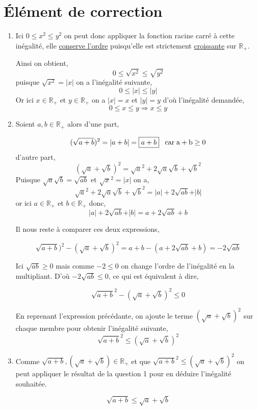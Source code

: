 \documentclass[french]{book}
\newcommand{\ie}{\leq}
\begin{document}
\section*{Élément de correction}
\begin{enumerate}
\item Ici $0\leq x^2 \leq y^2$ on peut donc appliquer la fonction racine carré à cette inégalité, elle \underline{conserve l'ordre} puisqu'elle est strictement \underline{croissante} sur $\mathbb{R}_+$.

Ainsi on obtient,
$$0\ie \sqrt{x^2} \ie \sqrt{y^2}$$
puisque $\sqrt{x^2}=\vert x \vert$ on a l'inégalité suivante,
$$0 \ie \vert x \vert \ie \vert y \vert$$ 
Or ici $x\in \mathbb{R}_+$ et $y\in \mathbb{R}_+$ on a $\vert x \vert=x$ et  $ \vert y \vert =y $ d'où l'inégalité demandée,
$$0 \ie x \ie y \Longrightarrow  \boxed{x \ie y}$$ 

\item Soient $a,b \in \mathbb{R}_+$ alors d'une part,

$$(\sqrt{a+b})^2=\vert a+b \vert =\boxed{a+b} \;\;\; \rm{car \; a+b} \geq 0$$
d'autre part,
$$(\sqrt{a}+\sqrt{b})^2= \sqrt{a}^2+ 2\sqrt{a}\sqrt{b} + \sqrt{b}^2$$
Puisque $\sqrt{a}\sqrt{b}=\sqrt{ab}$ et $\sqrt{x}^2=\vert x \vert $ on a,
$$\sqrt{a}^2+ 2\sqrt{a}\sqrt{b} + \sqrt{b}^2 = \vert a \vert + 2\sqrt{ab} + \vert b \vert $$
or ici $a \in \mathbb{R}_+$ et  $b \in \mathbb{R}_+$ donc,
$$ \vert a \vert + 2\sqrt{ab} + \vert b \vert = \boxed{a +2\sqrt{ab} + b}$$
 
 Il nous reste à comparer ces deux expressions,
 
 $$\sqrt{a+b})^2-(\sqrt{a}+\sqrt{b})^2=a+b-(a+2\sqrt{ab}+b)=-2\sqrt{ab}$$

Ici $\sqrt{ab} \geq 0$ mais comme $-2 \ie 0$ on change l'ordre de l'inégalité en la multipliant. D'où $-2\sqrt{ab} \ie 0$, ce qui est équivalent à dire,

$$\sqrt{a+b}^2-(\sqrt{a}+\sqrt{b})^2 \ie 0$$ 

En reprenant l'expression précédante, on ajoute le terme $(\sqrt{a}+\sqrt{b})^2$ sur chaque membre pour obtenir l'inégalité suivante,
 $$\sqrt{a+b}^2\ie(\sqrt{a}+\sqrt{b})^2 $$

\item Comme $\sqrt{a+b},(\sqrt{a}+\sqrt{b}) \in \mathbb{R}_+$ et que $\sqrt{a+b}^2\ie(\sqrt{a}+\sqrt{b})^2 $ on peut appliquer le résultat de la question 1 pour en déduire l'inégalité souhaitée.

$$\boxed{\sqrt{a+b} \ie \sqrt{a} + \sqrt{b}}$$

\end{enumerate}
\end{document}
